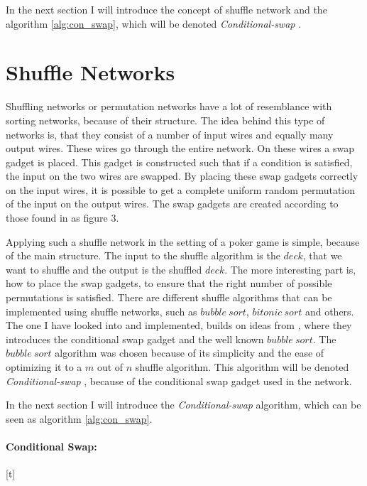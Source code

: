 \documentclass[twoside,11pt,openright]{report}
\newcommand{\CS}{\textit{Conditional-swap} }
\begin{document}
\bigskip

In the next section I will introduce the concept of shuffle network and the algorithm \ref{alg:con_swap}, which will be denoted \CS.


\section{Shuffle Networks}
Shuffling networks or permutation networks have a lot of resemblance with sorting networks, because of their structure. The idea behind this type of networks is, that they consist of a number of input wires and equally many output wires. These wires go through the entire network. On these wires a swap gadget is placed. This gadget is constructed such that if a condition is satisfied, the input on the two wires are swapped. By placing these swap gadgets correctly on the input wires, it is possible to get a complete uniform random permutation of the input on the output wires. The swap gadgets are created according to those found in \cite{psi} as figure 3.

Applying such a shuffle network in the setting of a poker game is simple, because of the main structure. The input to the shuffle algorithm is the $deck$, that we want to shuffle and the output is the shuffled $deck$. The more interesting part is, how to place the swap gadgets, to ensure that the right number of possible permutations is satisfied. There are different shuffle algorithms that can be implemented using shuffle networks, such as $bubble~sort$, $bitonic~sort$ and others. The one I have looked into and implemented, builds on ideas from \cite{psi}, where they introduces the conditional swap gadget and the well known $bubble~sort$. The $bubble~sort$ algorithm was chosen because of its simplicity and the ease of optimizing it to a $m$ out of $n$ shuffle algorithm. This algorithm will be denoted \CS, because of the conditional swap gadget used in the network.

\bigskip

In the next section I will introduce the \CS algorithm, which can be seen as algorithm \ref{alg:con_swap}.

\bigskip

\paragraph{Conditional Swap:}[t]
\label{sec:con_swap}
\end{document}
